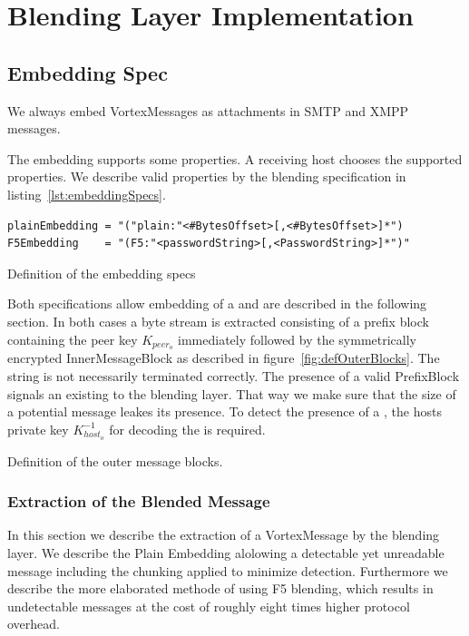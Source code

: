 \chapter{Blending Layer Implementation}
\section{Embedding Spec}
We always embed VortexMessages as attachments in SMTP and XMPP messages. 

The embedding supports some properties. A receiving host chooses the supported properties. We describe valid properties by the blending specification in listing~\ref{lst:embeddingSpecs}.

\begin{lstfloat}[h!]
\begin{lstlisting}[language=EBNF]
plainEmbedding = "("plain:"<#BytesOffset>[,<#BytesOffset>]*")
F5Embedding    = "(F5:"<passwordString>[,<PasswordString>]*")"
\end{lstlisting}
\caption{Definition of the embedding specs}
\label{lst:embeddingSpecs}
\end{lstfloat}

Both specifications allow embedding of a \VortexMessage{} and are described in the following section. In both cases a byte stream is extracted consisting of a prefix block containing the peer key $K_{peer_o}$ immediately followed by the symmetrically encrypted InnerMessageBlock as described in figure~\ref{fig:defOuterBlocks}. The string is not necessarily terminated correctly. The presence of a valid PrefixBlock signals an existing \VortexMessage{} to the blending layer. That way we make sure that the size of a potential message leakes its presence. To detect the presence of a \VortexMessage{}, the hosts private key $K^{-1}_{host_o}$ for decoding the is required. 

\begin{lstfloat}[ht]
	
	\caption{Definition of the outer message blocks.}
	\label{fig:defOuterBlocks}
\end{lstfloat}

\subsection{Extraction of the Blended Message}
In this section we describe the extraction of a VortexMessage by the blending layer. We describe the Plain Embedding alolowing a detectable yet unreadable message including the chunking applied to minimize detection. Furthermore we describe the more elaborated methode of using F5  blending, which results in undetectable messages at the cost of roughly eight times higher protocol overhead.


